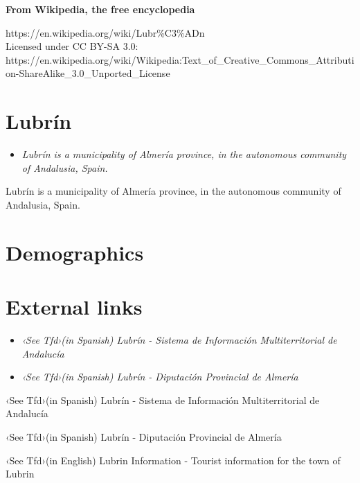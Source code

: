 \textbf{From Wikipedia, the free encyclopedia}

https://en.wikipedia.org/wiki/Lubr\%C3\%ADn\\
Licensed under CC BY-SA 3.0:\\
https://en.wikipedia.org/wiki/Wikipedia:Text\_of\_Creative\_Commons\_Attribution-ShareAlike\_3.0\_Unported\_License

\section{Lubrín}\label{lubruxedn}

\begin{itemize}
\item
  \emph{Lubrín is a municipality of Almería province, in the autonomous
  community of Andalusia, Spain.}
\end{itemize}

Lubrín is a municipality of Almería province, in the autonomous
community of Andalusia, Spain.

\section{Demographics}\label{demographics}

\section{External links}\label{external-links}

\begin{itemize}
\item
  \emph{‹See Tfd›(in Spanish) Lubrín - Sistema de Información
  Multiterritorial de Andalucía}
\item
  \emph{‹See Tfd›(in Spanish) Lubrín - Diputación Provincial de Almería}
\end{itemize}

‹See Tfd›(in Spanish) Lubrín - Sistema de Información Multiterritorial
de Andalucía

‹See Tfd›(in Spanish) Lubrín - Diputación Provincial de Almería

‹See Tfd›(in English) Lubrin Information - Tourist information for the
town of Lubrin

